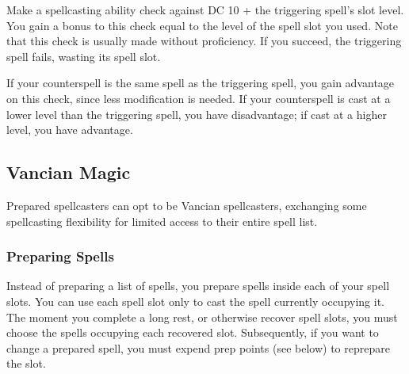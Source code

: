 \documentclass[letterpaper,twocolumn,openany,nodeprecatedcode,bg=print]{dndbook}
\begin{document}

Make a spellcasting ability check against DC 10 + the triggering spell's slot level. 
You gain a bonus to this check equal to the level of the spell slot you used. 
Note that this check is usually made without proficiency. 
If you succeed, the triggering spell fails, wasting its spell slot.

If your counterspell is the same spell as the triggering spell, you gain advantage on this check, since less modification is needed. 
If your counterspell is cast at a lower level than the triggering spell, you have disadvantage; if cast at a higher level, you have advantage.

\subsection{Vancian Magic}
Prepared spellcasters can opt to be Vancian spellcasters, 
exchanging some spellcasting flexibility for limited access to their entire spell list.

\subsubsection{Preparing Spells}
Instead of preparing a list of spells, you prepare spells inside each of your spell slots. 
You can use each spell slot only to cast the spell currently occupying it.
The moment you complete a long rest, or otherwise recover spell slots, you must choose the spells occupying each recovered slot. 
Subsequently, if you want to change a prepared spell, you must expend prep points (see below) to reprepare the slot.
\end{document}
